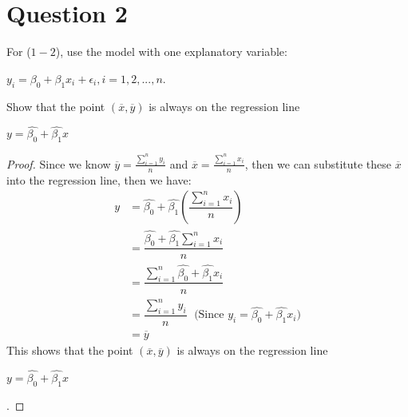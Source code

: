 \section{Question 2}

\begin{question}
    For ($1-2$), use the model with one explanatory variable:
    \begin{center}
        $y_i = \beta_0 + \beta_1x_i + \epsilon_i, i = 1,2,...,n$.
    \end{center}
    Show that the point $(\overline{x},\overline{y})$ is always on the regression line
    \begin{center}
        $y = \hat{\beta_0} + \hat{\beta_1}x$
    \end{center}
\end{question}

\begin{answer}
    \begin{proof}
        Since we know $\overline{y} = \tfrac{\sum_{i = 1}^{n}{y_i}}{n}$ and $\overline{x} = \tfrac{\sum_{i = 1}^{n}{x_i}}{n}$, then we can substitute these $\overline{x}$ into the regression line, then we have:
        \begin{align}
            y &= \hat{\beta_0} + \hat{\beta_1}\left(\dfrac{\sum_{i = 1}^{n}{x_i}}{n}\right)\\
            & = \dfrac{\hat{\beta_0} + \hat{\beta_1}\sum_{i = 1}^{n}{x_i}}{n}\\
            & = \dfrac{\sum_{i = 1}^{n}{\hat{\beta_0} + \hat{\beta_1}x_i}}{n}\\
            & = \dfrac{\sum_{i = 1}^{n}{y_i}}{n}\; \text{  (Since } y_i = \hat{\beta_0} + \hat{\beta_1}x_i \text{)}\\
            & = \overline{y}
        \end{align}
        This shows that the point $(\overline{x},\overline{y})$ is always on the regression line 
        \begin{center}
            $y = \hat{\beta_0} + \hat{\beta_1}x$
        \end{center}. 
    \end{proof}
\end{answer}
